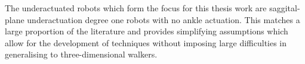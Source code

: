 The underactuated robots which form the focus for this thesis work are saggital-plane underactuation degree one robots with no ankle actuation. This matches a large proportion of the literature and provides simplifying assumptions which allow for the development of techniques without imposing large difficulties in generalising to three-dimensional walkers.
